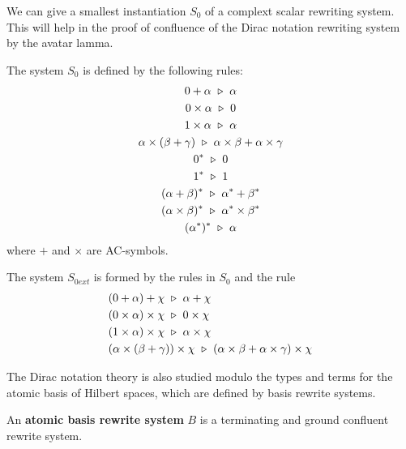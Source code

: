 We can give a smallest instantiation $S_0$ of a complext scalar rewriting system. This will help in the proof of confluence of the Dirac notation rewriting system by the avatar lamma.

\begin{definition}
  The system $S_0$ is defined by the following rules:
  \begin{gather*}
    0 + \alpha \ \triangleright\  \alpha\\
    0 \times \alpha \ \triangleright\  0\\
    1 \times \alpha \ \triangleright\  \alpha\\
    \alpha \times (\beta + \gamma) \ \triangleright\  \alpha \times \beta + \alpha \times \gamma\\
    0^* \ \triangleright\  0 \\
    1^* \ \triangleright\  1 \\
    (\alpha + \beta)^* \ \triangleright\  \alpha^* + \beta^*\\
    (\alpha \times \beta)^* \ \triangleright\  \alpha^* \times \beta^*\\
    (\alpha^*)^* \ \triangleright\  \alpha
  \end{gather*}
  where $+$ and $\times$ are AC-symbols.
\end{definition}


\begin{definition}[$S_{0ext}$]
  The system $S_{0ext}$ is formed by the rules in $S_0$ and the rule
  \begin{align*}
    & (0 + \alpha) + \chi \ \triangleright\  \alpha + \chi \\
    & (0 \times \alpha) \times \chi \ \triangleright\  0 \times \chi \\
    & (1 \times \alpha) \times \chi \ \triangleright\  \alpha \times \chi \\
    & (\alpha \times (\beta + \gamma)) \times \chi \ \triangleright\  (\alpha \times \beta + \alpha \times \gamma) \times \chi \\
  \end{align*}
\end{definition}


The Dirac notation theory is also studied modulo the types and terms for the atomic basis of Hilbert spaces, which are defined by basis rewrite systems.

\begin{definition}
  An \textbf{atomic basis rewrite system} $B$ is a terminating and ground confluent rewrite system.
\end{definition}

